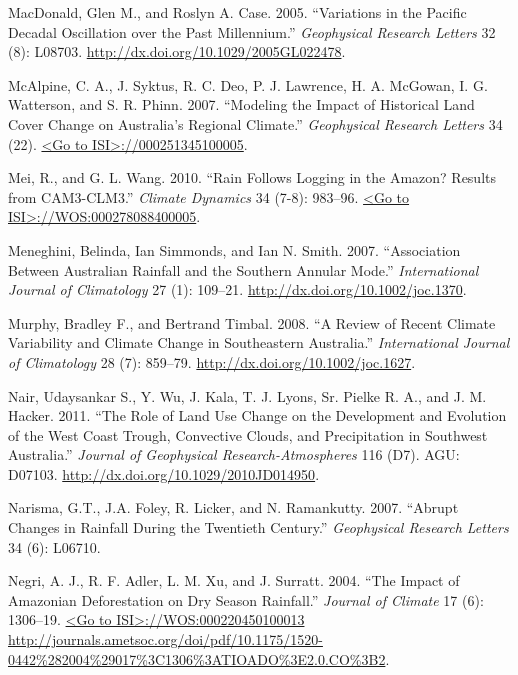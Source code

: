 \documentclass[fleqn,10pt,lineno]{wlpeerj} %
\begin{document}
\hypertarget{ref-MacDonald2005}{}
MacDonald, Glen M., and Roslyn A. Case. 2005. ``Variations in the
Pacific Decadal Oscillation over the Past Millennium.''
\emph{Geophysical Research Letters} 32 (8): L08703.
\url{http://dx.doi.org/10.1029/2005GL022478}.

\hypertarget{ref-McAlpine2007}{}
McAlpine, C. A., J. Syktus, R. C. Deo, P. J. Lawrence, H. A. McGowan, I.
G. Watterson, and S. R. Phinn. 2007. ``Modeling the Impact of Historical
Land Cover Change on Australia's Regional Climate.'' \emph{Geophysical
Research Letters} 34 (22).
\href{\%3CGo\%20to\%20ISI\%3E://000251345100005}{\textless{}Go to ISI\textgreater{}://000251345100005}.

\hypertarget{ref-Mei2010}{}
Mei, R., and G. L. Wang. 2010. ``Rain Follows Logging in the Amazon?
Results from CAM3-CLM3.'' \emph{Climate Dynamics} 34 (7-8): 983--96.
\href{\%3CGo\%20to\%20ISI\%3E://WOS:000278088400005}{\textless{}Go to ISI\textgreater{}://WOS:000278088400005}.

\hypertarget{ref-Meneghini2007}{}
Meneghini, Belinda, Ian Simmonds, and Ian N. Smith. 2007. ``Association
Between Australian Rainfall and the Southern Annular Mode.''
\emph{International Journal of Climatology} 27 (1): 109--21.
\url{http://dx.doi.org/10.1002/joc.1370}.

\hypertarget{ref-Murphy2008}{}
Murphy, Bradley F., and Bertrand Timbal. 2008. ``A Review of Recent
Climate Variability and Climate Change in Southeastern Australia.''
\emph{International Journal of Climatology} 28 (7): 859--79.
\url{http://dx.doi.org/10.1002/joc.1627}.

\hypertarget{ref-Nair2011}{}
Nair, Udaysankar S., Y. Wu, J. Kala, T. J. Lyons, Sr. Pielke R. A., and
J. M. Hacker. 2011. ``The Role of Land Use Change on the Development and
Evolution of the West Coast Trough, Convective Clouds, and Precipitation
in Southwest Australia.'' \emph{Journal of Geophysical
Research-Atmospheres} 116 (D7). AGU: D07103.
\url{http://dx.doi.org/10.1029/2010JD014950}.

\hypertarget{ref-Narisma2007}{}
Narisma, G.T., J.A. Foley, R. Licker, and N. Ramankutty. 2007. ``Abrupt
Changes in Rainfall During the Twentieth Century.'' \emph{Geophysical
Research Letters} 34 (6): L06710.

\hypertarget{ref-Negri2004}{}
Negri, A. J., R. F. Adler, L. M. Xu, and J. Surratt. 2004. ``The Impact
of Amazonian Deforestation on Dry Season Rainfall.'' \emph{Journal of
Climate} 17 (6): 1306--19.
\href{\%3CGo\%20to\%20ISI\%3E://WOS:000220450100013\%20http://journals.ametsoc.org/doi/pdf/10.1175/1520-0442\%282004\%29017\%3C1306\%3ATIOADO\%3E2.0.CO\%3B2}{\textless{}Go to ISI\textgreater{}://WOS:000220450100013 http://journals.ametsoc.org/doi/pdf/10.1175/1520-0442\%282004\%29017\%3C1306\%3ATIOADO\%3E2.0.CO\%3B2}.
\end{document}
